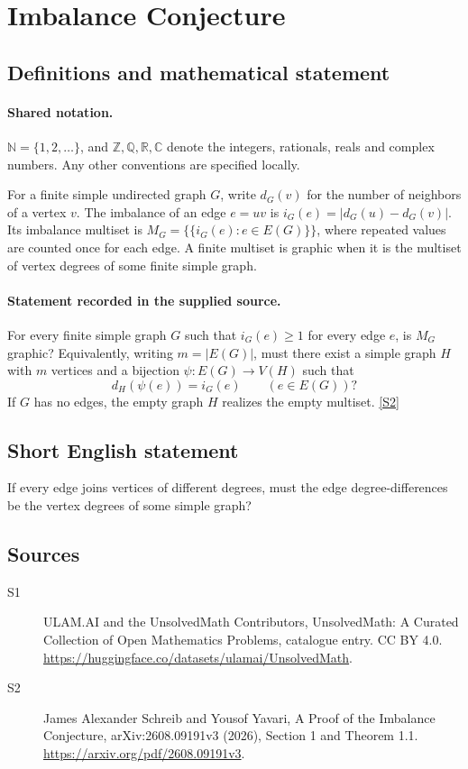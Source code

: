 \documentclass[11pt]{article}
\newcommand{\sref}[2]{\hyperlink{source:#1:#2}{[S#2]}}
\begin{document}
\section{Imbalance Conjecture}\label{statement}

\subsection{Definitions and mathematical statement}

\paragraph{Shared notation.}$\mathbb N=\{1,2,\ldots\}$, and $\mathbb Z,\mathbb Q,\mathbb R,\mathbb C$ denote the integers, rationals, reals and complex numbers. Any other conventions are specified locally.


For a finite simple undirected graph $G$, write $d_G(v)$ for the number of neighbors of a vertex $v$. The imbalance of an edge $e=uv$ is $i_G(e)=|d_G(u)-d_G(v)|$. Its imbalance multiset is $M_G=\{\!\{i_G(e):e\in E(G)\}\!\}$, where repeated values are counted once for each edge. A finite multiset is graphic when it is the multiset of vertex degrees of some finite simple graph.
\paragraph{Statement recorded in the supplied source.}
For every finite simple graph $G$ such that $i_G(e)\ge1$ for every edge $e$, is $M_G$ graphic? Equivalently, writing $m=|E(G)|$, must there exist a simple graph $H$ with $m$ vertices and a bijection $\psi:E(G)\to V(H)$ such that
\[
 d_H(\psi(e))=i_G(e)\qquad(e\in E(G))?
\]
If $G$ has no edges, the empty graph $H$ realizes the empty multiset. \sref{statement}{2}
\subsection{Short English statement}
If every edge joins vertices of different degrees, must the edge degree-differences be the vertex degrees of some simple graph?
\subsection{Sources}
\begin{description}
\item[\hypertarget{source:statement:1}{S1}] ULAM.AI and the UnsolvedMath Contributors, UnsolvedMath: A Curated Collection of Open Mathematics Problems, catalogue entry. CC BY 4.0. \url{https://huggingface.co/datasets/ulamai/UnsolvedMath}.
\item[\hypertarget{source:statement:2}{S2}] James Alexander Schreib and Yousof Yavari, A Proof of the Imbalance Conjecture, arXiv:2608.09191v3 (2026), Section 1 and Theorem 1.1. \url{https://arxiv.org/pdf/2608.09191v3}.
\end{description}
\label{end:statement}
\end{document}
